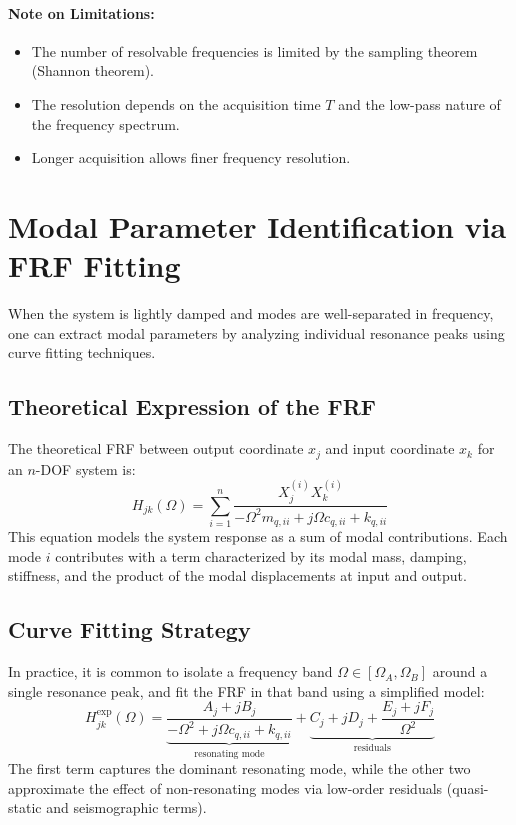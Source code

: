 \paragraph{Note on Limitations:}
\begin{itemize}
    \item The number of resolvable frequencies is limited by the sampling theorem (Shannon theorem).
    \item The resolution depends on the acquisition time \( T \) and the low-pass nature of the frequency spectrum.
    \item Longer acquisition allows finer frequency resolution.
\end{itemize}

\section{Modal Parameter Identification via FRF Fitting}

When the system is lightly damped and modes are well-separated in frequency, one can extract modal parameters by analyzing individual resonance peaks using curve fitting techniques.

\subsection{Theoretical Expression of the FRF}

The theoretical FRF between output coordinate \( x_j \) and input coordinate \( x_k \) for an \( n \)-DOF system is:
\[
H_{jk}(\Omega) = \sum_{i=1}^n \frac{X_j^{(i)} X_k^{(i)}}{-\Omega^2 m_{q,ii} + j \Omega c_{q,ii} + k_{q,ii}}
\]
This equation models the system response as a sum of modal contributions. Each mode \( i \) contributes with a term characterized by its modal mass, damping, stiffness, and the product of the modal displacements at input and output.

\subsection{Curve Fitting Strategy}

In practice, it is common to isolate a frequency band \( \Omega \in [\Omega_A, \Omega_B] \) around a single resonance peak, and fit the FRF in that band using a simplified model:
\[
H_{jk}^{\text{exp}}(\Omega) = \underbrace{\frac{A_{j} + j B_{j}}{-\Omega^2 + j \Omega c_{q,ii} + k_{q,ii}}}_{\text{resonating mode}} + 
\underbrace{C_{j} + j D_{j} + \frac{E_{j} + j F_{j}}{\Omega^2}}_{\text{residuals}}
\]
The first term captures the dominant resonating mode, while the other two approximate the effect of non-resonating modes via low-order residuals (quasi-static and seismographic terms).


